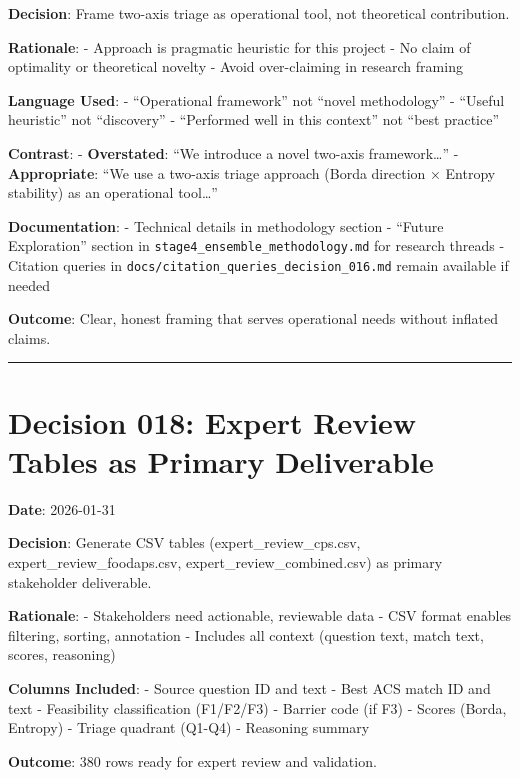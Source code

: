 \documentclass[
  letterpaper,
]{report}
\begin{document}
\textbf{Decision}: Frame two-axis triage as operational tool, not
theoretical contribution.

\textbf{Rationale}: - Approach is pragmatic heuristic for this project -
No claim of optimality or theoretical novelty - Avoid over-claiming in
research framing

\textbf{Language Used}: - ``Operational framework'' not ``novel
methodology'' - ``Useful heuristic'' not ``discovery'' - ``Performed
well in this context'' not ``best practice''

\textbf{Contrast}: - \textbf{Overstated}: ``We introduce a novel
two-axis framework\ldots{}'' - \textbf{Appropriate}: ``We use a two-axis
triage approach (Borda direction × Entropy stability) as an operational
tool\ldots{}''

\textbf{Documentation}: - Technical details in methodology section -
``Future Exploration'' section in
\texttt{stage4\_ensemble\_methodology.md} for research threads -
Citation queries in \texttt{docs/citation\_queries\_decision\_016.md}
remain available if needed

\textbf{Outcome}: Clear, honest framing that serves operational needs
without inflated claims.

\begin{center}\rule{0.5\linewidth}{0.5pt}\end{center}

\section{Decision 018: Expert Review Tables as Primary
Deliverable}\label{decision-018-expert-review-tables-as-primary-deliverable}

\textbf{Date}: 2026-01-31

\textbf{Decision}: Generate CSV tables (expert\_review\_cps.csv,
expert\_review\_foodaps.csv, expert\_review\_combined.csv) as primary
stakeholder deliverable.

\textbf{Rationale}: - Stakeholders need actionable, reviewable data -
CSV format enables filtering, sorting, annotation - Includes all context
(question text, match text, scores, reasoning)

\textbf{Columns Included}: - Source question ID and text - Best ACS
match ID and text - Feasibility classification (F1/F2/F3) - Barrier code
(if F3) - Scores (Borda, Entropy) - Triage quadrant (Q1-Q4) - Reasoning
summary

\textbf{Outcome}: 380 rows ready for expert review and validation.
\end{document}
